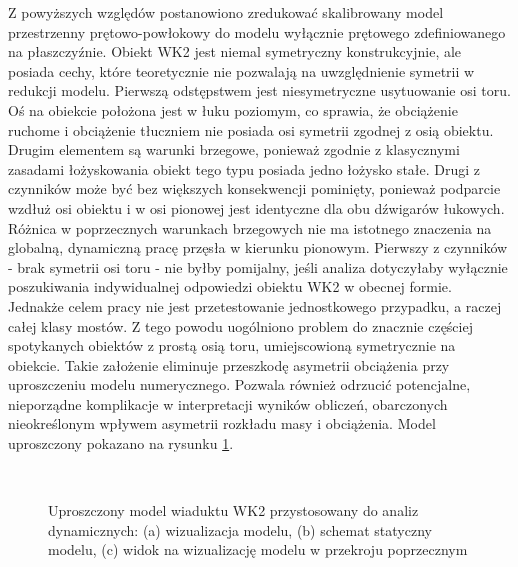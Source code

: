 Z powyższych względów postanowiono zredukować skalibrowany model przestrzenny prętowo-powłokowy do modelu wyłącznie prętowego zdefiniowanego na płaszczyźnie. Obiekt WK2 jest niemal symetryczny konstrukcyjnie, ale posiada cechy, które teoretycznie nie pozwalają na uwzględnienie symetrii w redukcji modelu. Pierwszą odstępstwem jest niesymetryczne usytuowanie osi toru. Oś na obiekcie położona jest w łuku poziomym, co sprawia, że obciążenie ruchome i obciążenie tłuczniem nie posiada osi symetrii zgodnej z osią obiektu. Drugim elementem są warunki brzegowe, ponieważ zgodnie z klasycznymi zasadami łożyskowania obiekt tego typu posiada jedno łożysko stałe. Drugi z czynników może być bez większych konsekwencji pominięty, ponieważ podparcie wzdłuż osi obiektu i w osi pionowej jest identyczne dla obu dźwigarów łukowych. Różnica w poprzecznych warunkach brzegowych nie ma istotnego znaczenia na globalną, dynamiczną pracę przęsła w kierunku pionowym. Pierwszy z czynników - brak symetrii osi toru - nie byłby pomijalny, jeśli analiza dotyczyłaby wyłącznie poszukiwania indywidualnej odpowiedzi obiektu WK2 w obecnej formie. Jednakże celem pracy nie jest przetestowanie jednostkowego przypadku, a raczej całej klasy mostów. Z tego powodu uogólniono problem do znacznie częściej spotykanych obiektów z prostą osią toru, umiejscowioną symetrycznie na obiekcie. Takie założenie eliminuje przeszkodę asymetrii obciążenia przy uproszczeniu modelu numerycznego. Pozwala również odrzucić potencjalne, nieporządne komplikacje w interpretacji wyników obliczeń, obarczonych nieokreślonym wpływem asymetrii rozkładu masy i obciążenia. Model uproszczony pokazano na rysunku \ref{fig:wk2_model_plaski}.

\begin{figure}[hbt!]
	\centering
	\begin{minipage}{0.7\textwidth}
		\\
	\end{minipage}\qquad
	\begin{minipage}{0.15\textwidth}
	\end{minipage}
	\captionsetup{justification=centering}
	\caption{Uproszczony model wiaduktu WK2 przystosowany do analiz dynamicznych: (a) wizualizacja modelu, (b) schemat statyczny modelu, (c) widok na wizualizację modelu w przekroju poprzecznym}
	\label{fig:wk2_model_plaski}
\end{figure}


